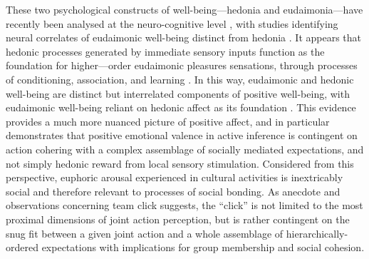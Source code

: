 \begin{CJK}{UTF8}{gbsn}
{These two psychological constructs of well-being---hedonia and eudaimonia---have recently been analysed at the neuro-cognitive level \citep{Berridge2011}, with studies identifying neural correlates of eudaimonic well-being distinct from hedonia \citep{Lewis2014}. It appears that hedonic processes generated by immediate sensory inputs function as the foundation for higher—order eudaimonic pleasures sensations, through processes of conditioning, association, and learning \citep{Berridge2003}.  In this way, eudaimonic and hedonic well-being are distinct but interrelated components of positive well-being, with eudaimonic well-being reliant on hedonic affect as its foundation \citep{Berridge2011}. This evidence provides a much more nuanced picture of positive affect, and in particular demonstrates that positive emotional valence in active inference is contingent on action cohering with a complex assemblage of socially mediated expectations, and not simply hedonic reward from local sensory stimulation.  Considered from this perspective, euphoric arousal experienced in cultural activities is inextricably social and therefore relevant to processes of social bonding.
As anecdote and observations concerning team click suggests, the ``click'' is not limited to the most proximal dimensions of joint action perception, but is rather contingent on the snug fit between a given joint action and a whole assemblage of hierarchically-ordered expectations with implications for group membership and social cohesion.

}
\end{CJK}
